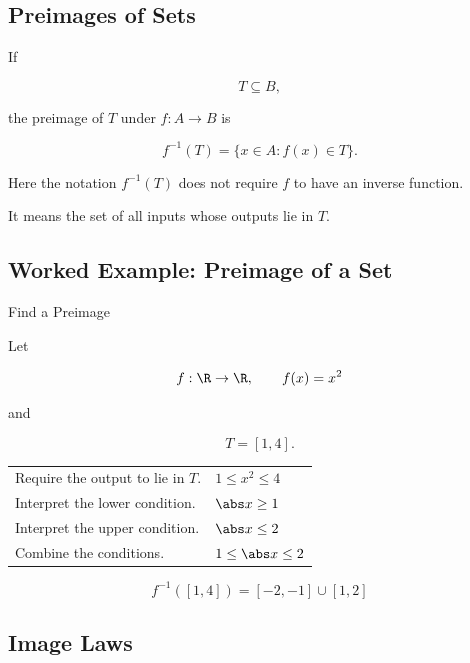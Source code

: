 \subsection{Preimages of Sets}
\label{subsec:preimages-of-sets}

If

\[ T\subseteq B, \]

the preimage of \(T\) under \(f:A\to B\) is

\[ f^{-1}(T)=\{x\in A:f(x)\in T\}. \]

Here the notation \(f^{-1}(T)\) does not require \(f\) to have an inverse
function.

It means the set of all inputs whose outputs lie in \(T\).

\subsection{Worked Example: Preimage of a Set}
\label{subsec:worked-preimage-set}

\begin{workedexamplebox}{Find a Preimage}

Let

\[ f:\R\to\R,\qquad f(x)=x^2 \]

and

\[ T=[1,4]. \]

\begin{tabularx}{\textwidth}{@{}>{\raggedright\arraybackslash}p{}X@{}}
Require the output to lie in \(T\). & \(1\leq x^2\leq4\)\\
Interpret the lower condition. & \(\abs x\geq1\)\\
Interpret the upper condition. & \(\abs x\leq2\)\\
Combine the conditions. & \(1\leq\abs x\leq2\)
\end{tabularx}

\begin{answerbox}
\[ f^{-1}([1,4])=[-2,-1]\cup[1,2] \]
\end{answerbox}
\end{workedexamplebox}

\subsection{Image Laws}
\label{subsec:image-laws}

